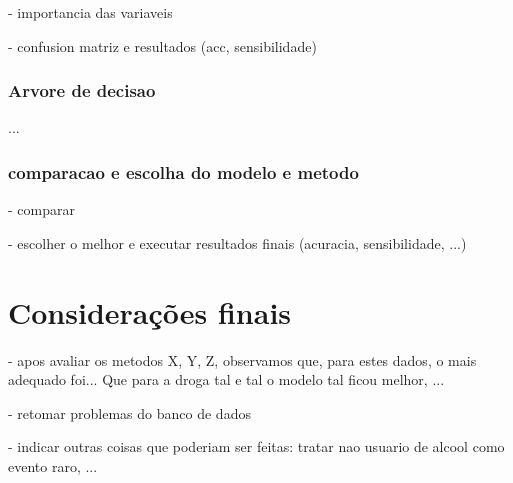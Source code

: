 \documentclass[
	article,			%
	11pt,				%
	oneside,			%
	a4paper,			%
	english,			%
	brazil,				%
	sumario=tradicional
	]{abntex2}
\begin{document}
- importancia das variaveis

- confusion matriz e resultados (acc, sensibilidade)

\subsubsection{Arvore de decisao}
... 

\subsubsection{comparacao e escolha do modelo e metodo}

- comparar

- escolher o melhor e executar resultados finais (acuracia, sensibilidade, ...)

% 

\section*{Considerações finais}


- apos avaliar os metodos X, Y, Z, observamos que, para estes dados, o mais adequado foi... Que para a droga tal e tal o modelo tal ficou melhor, ...

- retomar problemas do banco de dados

- indicar outras coisas que poderiam ser feitas: tratar nao usuario de alcool como evento raro, ...



%
%

%
%
%

%
%
\end{document}
